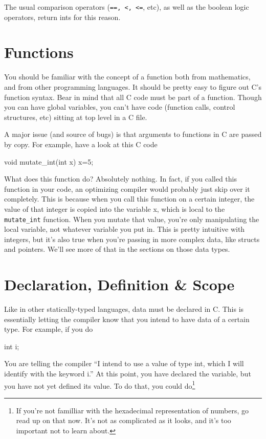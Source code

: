 \documentclass[ebook,11pt,oneside,openany]{memoir}
\newcommand{\cf}[1]{\texttt{#1}}
\begin{document}
The usual comparison operators (\texttt{==, <, <=}, etc), as well as the boolean logic operators, return ints for this reason.

\section{Functions}
You should be familiar with the concept of a function both from mathematics, and from other programming languages. It should be pretty easy to figure out C's function syntax. Bear in mind that all C code must be part of a function. Though you can have global variables, you can't have code (function calls, control structures, etc) sitting at top level in a C file.

A major issue (and source of bugs) is that arguments to functions in C are passed by copy. For example, have a look at this C code

\begin{code}[language=C]
void mutate_int(int x)
{
	x=5;
}
\end{code}

What does this function do? Absolutely nothing. In fact, if you called this function in your code, an optimizing compiler would probably just skip over it completely. This is because when you call this function on a certain integer, the value of that integer is copied into the variable x, which is local to the \cf{mutate\_int} function. When you mutate that value, you're only manipulating the local variable, not whatever variable you put in. This is pretty intuitive with integers, but it's also true when you're passing in more complex data, like structs and pointers. We'll see more of that in the sections on those data types.

\section{Declaration, Definition \& Scope}
Like in other statically-typed languages, data must be declared in C. This is essentially letting the compiler know that you intend to have data of a certain type. For example, if you do 

\begin{code}[language=C]
int i;
\end{code}

You are telling the compiler ``I intend to use a value of type int, which I will identify with the keyword i.'' At this point, you have declared the variable, but you have not yet defined its value. To do that, you could do\footnote{If you're not familliar with the hexadecimal representation of numbers, go read up on that now. It's not as complicated as it looks, and it's too important not to learn about.}
\end{document}
